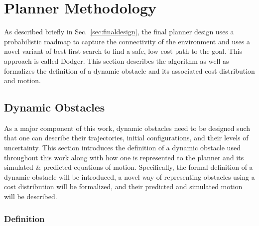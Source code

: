 


\chapter{Planner Methodology}

\label{chapter:methodology}

As described briefly in Sec.~\ref{sec:finaldesign}, the final planner design
uses a probabilistic roadmap to capture the connectivity of the environment and
uses a novel variant of best first search to find a safe, low cost path to the
goal. This approach is called Dodger. This section describes the algorithm as
well as formalizes the definition of a dynamic obstacle and its associated cost
distribution and motion.

\section{Dynamic Obstacles}

As a major component of this work, dynamic obstacles need to be designed such
that one can describe their trajectories, initial configurations, and their
levels of uncertainty. This section introduces the definition of a dynamic
obstacle used throughout this work along with how one is represented to the
planner and its simulated \& predicted equations of motion. Specifically, the
formal definition of a dynamic obstacle will be introduced, a novel way of
representing obstacles using a cost distribution will be formalized, and their
predicted and simulated motion will be described.

\subsection{Definition}

\label{sec:def}

